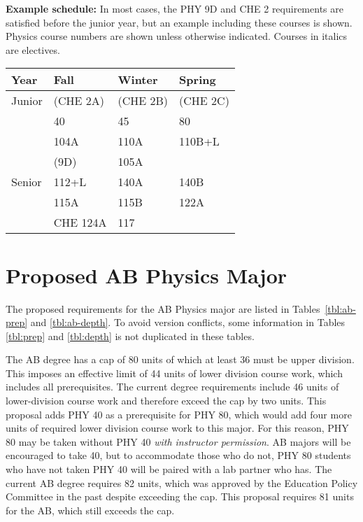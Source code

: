 \documentclass[12pt]{article}
\begin{document}
\noindent
{\bf Example schedule:} In most cases, the PHY 9D and CHE 2 requirements are
satisfied before the junior year, but an example including these courses is
shown.  Physics course numbers are shown unless otherwise indicated.
Courses in italics are electives.

\begin{center}
\begin{tabular}{|l|l|l|l|}
\hline
Year      & Fall    & Winter & Spring \\
\hline
Junior    & (CHE 2A)   & (CHE 2B)     & (CHE 2C) \\
          & 40         & 45           & 80 \\
          & 104A       & 110A         & 110B+L \\
          & (9D)       & 105A         & \\

\hline
Senior   & 112+L         & 140A       & 140B\\
         & 115A          & 115B       & 122A\\
         & CHE 124A      & 117       &  \\
\hline
\end{tabular}
\end{center}

\newpage
\section{Proposed AB Physics Major}
\label{sec:ab}

The proposed requirements for the AB Physics major are listed in
Tables~\ref{tbl:ab-prep} and \ref{tbl:ab-depth}.  To avoid version
conflicts, some information in Tables \ref{tbl:prep} and
\ref{tbl:depth} is not duplicated in these tables.

The AB degree has a cap of 80 units of which at least 36 must be upper
division.  This imposes an effective limit of 44 units of lower
division course work, which includes all prerequisites.  The current
degree requirements include 46 units of lower-division course work and
therefore exceed the cap by two units.  This proposal adds PHY 40 as a
prerequisite for PHY 80, which would add four more units of required
lower division course work to this major.  For this reason, PHY 80 may
be taken without PHY 40 {\em with instructor permission}.  AB majors
will be encouraged to take 40, but to accommodate those who do not,
PHY 80 students who have not taken PHY 40 will be paired with a lab
partner who has.  The current AB degree requires 82 units, which was
approved by the Education Policy Committee in the past despite
exceeding the cap.  This proposal requires 81 units for the AB, which
still exceeds the cap.
\end{document}
